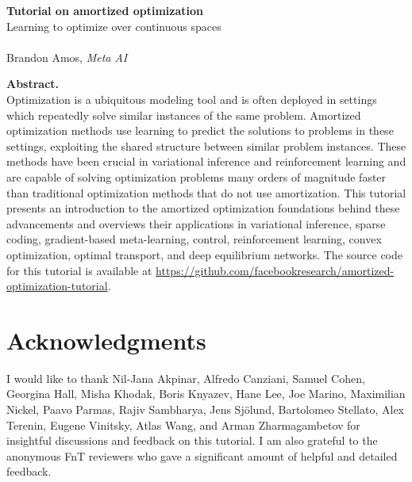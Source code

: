 \documentclass[oneside,11pt]{book}
\begin{document}
\begin{titlepage}
\thispagestyle{empty}
\begin{center}
\textbf{\Large Tutorial on amortized optimization} \\
{\large Learning to optimize over continuous spaces} \\~\\
Brandon Amos, \emph{Meta AI}
\end{center}

\vspace{0.9cm}
\noindent\textbf{Abstract.} \\
Optimization is a ubiquitous modeling tool and is often
deployed in settings which repeatedly solve similar
instances of the same problem.
Amortized optimization methods use learning to predict the solutions to
problems in these settings, exploiting the shared structure
between similar problem instances.
These methods have been crucial in variational inference
and reinforcement learning and are capable of solving
optimization problems many orders of magnitude faster
than traditional optimization methods that do not use amortization.
This tutorial presents an introduction to the amortized optimization
foundations behind these advancements and overviews
their applications in variational inference, sparse coding,
gradient-based meta-learning, control, reinforcement learning,
convex optimization, optimal transport, and deep equilibrium networks.
The source code for this tutorial is available at
{\footnotesize\url{https://github.com/facebookresearch/amortized-optimization-tutorial}}.
\end{titlepage}

\setcounter{tocdepth}{1}
\tableofcontents







\newpage
\section*{Acknowledgments}
I would like to thank
Nil-Jana Akpinar,
Alfredo Canziani,
Samuel Cohen,
Georgina Hall,
Misha Khodak,
Boris Knyazev,
Hane Lee,
Joe Marino,
Maximilian Nickel,
Paavo Parmas,
Rajiv Sambharya,
Jens Sj\"olund,
Bartolomeo Stellato,
Alex Terenin,
Eugene Vinitsky,
Atlas Wang,
and
Arman Zharmagambetov
for insightful discussions
and feedback on this tutorial.
I am also grateful to the anonymous FnT reviewers
who gave a significant amount of helpful and
detailed feedback.

{\footnotesize}
\end{document}
